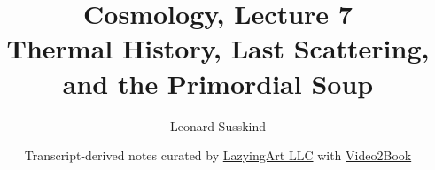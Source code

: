 \documentclass[11pt,oneside]{book}
\begin{document}
\hypersetup{pageanchor=false}
\frontmatter
\title{Cosmology, Lecture 7\\Thermal History, Last Scattering, and the Primordial Soup}
\author{Leonard Susskind}
\date{Transcript-derived notes curated by \href{https://lazying.art}{LazyingArt LLC} with \href{https://github.com/lachlanchen/Video2Book}{Video2Book}}
\maketitle
\hypersetup{pageanchor=true}
\mainmatter

\end{document}
